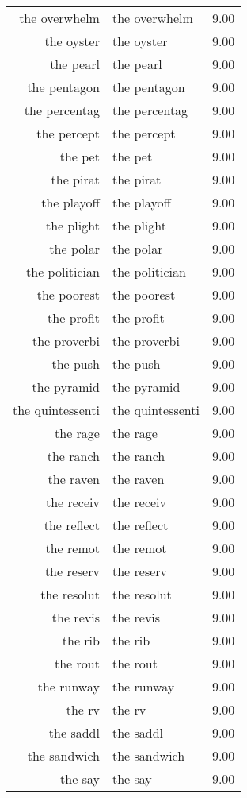 \begin{table}[ht]
\begin{tabular}{rlr}
  the overwhelm & the overwhelm & 9.00 \\ 
  the oyster & the oyster & 9.00 \\ 
  the pearl & the pearl & 9.00 \\ 
  the pentagon & the pentagon & 9.00 \\ 
  the percentag & the percentag & 9.00 \\ 
  the percept & the percept & 9.00 \\ 
  the pet & the pet & 9.00 \\ 
  the pirat & the pirat & 9.00 \\ 
  the playoff & the playoff & 9.00 \\ 
  the plight & the plight & 9.00 \\ 
  the polar & the polar & 9.00 \\ 
  the politician & the politician & 9.00 \\ 
  the poorest & the poorest & 9.00 \\ 
  the profit & the profit & 9.00 \\ 
  the proverbi & the proverbi & 9.00 \\ 
  the push & the push & 9.00 \\ 
  the pyramid & the pyramid & 9.00 \\ 
  the quintessenti & the quintessenti & 9.00 \\ 
  the rage & the rage & 9.00 \\ 
  the ranch & the ranch & 9.00 \\ 
  the raven & the raven & 9.00 \\ 
  the receiv & the receiv & 9.00 \\ 
  the reflect & the reflect & 9.00 \\ 
  the remot & the remot & 9.00 \\ 
  the reserv & the reserv & 9.00 \\ 
  the resolut & the resolut & 9.00 \\ 
  the revis & the revis & 9.00 \\ 
  the rib & the rib & 9.00 \\ 
  the rout & the rout & 9.00 \\ 
  the runway & the runway & 9.00 \\ 
  the rv & the rv & 9.00 \\ 
  the saddl & the saddl & 9.00 \\ 
  the sandwich & the sandwich & 9.00 \\ 
  the say & the say & 9.00 \\ 

\end{tabular}
\end{table}
